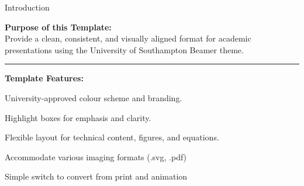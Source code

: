 
\begin{frame}{Introduction}
\normalsize


\begin{highlightbox}
    \textbf{Purpose of this Template:} \\
    Provide a clean, consistent, and visually aligned format for academic presentations using the University of Southampton Beamer theme.
\end{highlightbox}

\insertpause
\vspace{2mm}
\rule{\linewidth}{0.5pt}
\vspace{2mm}
\insertpause

\begin{highlightbox}
    \textbf{Template Features:}
    \begin{smartitemize}
        \item University-approved colour scheme and branding.
        \item Highlight boxes for emphasis and clarity.
        \item Flexible layout for technical content, figures, and equations.
        \item Accommodate various imaging formats (.svg, .pdf)
        \item Simple switch to convert from print and animation
    \end{smartitemize}
\end{highlightbox}

\end{frame}



